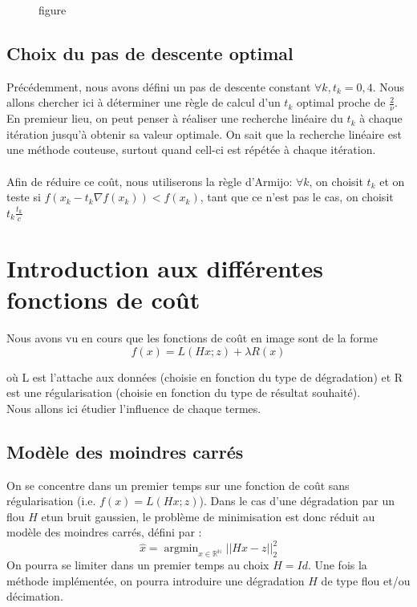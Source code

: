 \documentclass{article}
\DeclareMathOperator*{\argmin}{argmin}
\begin{document}
\begin{figure}[h]
\centering

\caption{figure}
\end{figure}


\vspace*{3mm}

\subsection{Choix du pas de descente optimal}
Précédemment, nous avons défini un pas de descente constant $\forall k, t_k = 0,4$. Nous allons chercher ici à déterminer une règle de calcul d'un $t_k$ optimal proche de $\frac{2}{\nu}$.\\
En premieur lieu, on peut penser à réaliser une recherche linéaire du $t_k$ à chaque itération jusqu'à obtenir sa valeur optimale. On sait que la recherche linéaire est une méthode couteuse, surtout quand cell-ci est répétée à chaque itération.  \\\\
Afin de réduire ce coût, nous utiliserons la règle d'Armijo: $\forall k$, on choisit $t_k$ et on teste si $f(x_k - t_k\nabla f(x_k)) < f(x_k)$, tant que ce n'est pas le cas, on choisit $t_k\frac{t_k}{c}$
\clearpage

\section{Introduction aux différentes fonctions de coût }
Nous avons vu en cours que les fonctions de coût en image sont de la forme
\begin{equation}
f(x) = L(Hx;z) + \lambda R(x)
\end{equation}

où L est l’attache aux données (choisie en fonction du type de dégradation) et R est une régularisation
(choisie en fonction du type de résultat souhaité).\\
Nous allons ici étudier l'influence de chaque termes.

\subsection{Modèle des moindres carrés}
On se concentre dans un premier temps sur une fonction de coût sans régularisation (i.e. $f (x) = L(Hx;z)$). Dans le cas d’une dégradation par un flou $H$ etun bruit gaussien, le problème de minimisation est donc réduit au modèle des moindres carrés, défini par :
\begin{equation}
\hat{x} = \argmin_{x \in \mathbb{R^N}}||Hx-z||_2^2
\label{eq:AR(M)}
\end{equation}
On pourra se limiter dans un premier temps au choix $H = Id$. Une fois la méthode implémentée, on pourra introduire une dégradation $H$ de type flou et/ou décimation.
\end{document}

